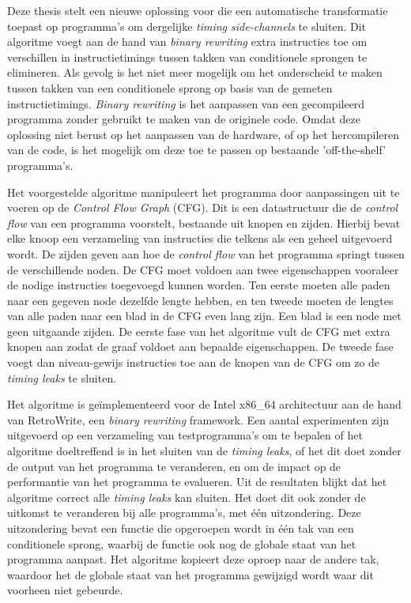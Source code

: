 \documentclass[master=cws,masteroption=ai, english]{kulemt}
\begin{document}
\begin{abstract*}
Deze thesis stelt een nieuwe oplossing voor die een automatische transformatie toepast op programma's om dergelijke \textit{timing side-channels} te sluiten. 
Dit algoritme voegt aan de hand van \textit{binary rewriting} extra instructies toe om verschillen in instructietimings tussen takken van conditionele sprongen te elimineren. 
Als gevolg is het niet meer mogelijk om het onderscheid te maken tussen takken van een conditionele sprong op basis van de gemeten instructietimings.
\textit{Binary rewriting} is het aanpassen van een gecompileerd programma zonder gebruikt te maken van de originele code. 
Omdat deze oplossing niet berust op het aanpassen van de hardware, of op het hercompileren van de code, is het mogelijk om deze toe te passen op bestaande 'off-the-shelf' programma's. 

Het voorgestelde algoritme manipuleert het programma door aanpassingen uit te voeren op de \textit{Control Flow Graph} (CFG). 
Dit is een datastructuur die de \textit{control flow} van een programma voorstelt, bestaande uit knopen en zijden. Hierbij bevat elke knoop een verzameling van instructies die telkens 
als een geheel uitgevoerd wordt. De zijden geven aan hoe de \textit{control flow} van het programma springt tussen de verschillende noden. 
De CFG moet voldoen aan twee eigenschappen vooraleer de nodige instructies toegevoegd kunnen worden. 
Ten eerste moeten alle paden naar een gegeven node dezelfde lengte hebben, en ten tweede 
moeten de lengtes van alle paden naar een blad in de CFG even lang zijn. Een blad is een node met geen uitgaande zijden. 
De eerste fase van het algoritme vult de CFG met extra knopen aan zodat de graaf voldoet aan bepaalde eigenschappen. 
De tweede fase voegt dan niveau-gewijs instructies toe aan de knopen van de CFG om zo de \textit{timing leaks} te sluiten. 

Het algoritme is ge\"implementeerd voor de Intel x86\_64 architectuur aan de hand van RetroWrite, een \textit{binary rewriting} framework. 
Een aantal experimenten zijn uitgevoerd op een verzameling van testprogramma's om te bepalen of het algoritme doeltreffend is in het sluiten van de \textit{timing leaks}, of het dit doet 
zonder de output van het programma te veranderen, en om de impact op de performantie van het programma te evalueren. 
Uit de resultaten blijkt dat het algoritme correct alle \textit{timing leaks} kan sluiten. Het doet dit ook zonder de uitkomst te veranderen bij alle programma's, met \'e\'en uitzondering. 
Deze uitzondering bevat een functie die opgeroepen wordt in \'e\'en tak van een conditionele sprong, waarbij de functie ook nog de globale staat van het programma aanpast. Het algoritme kopieert deze oproep naar de andere tak, waardoor
het de globale staat van het programma gewijzigd wordt waar dit voorheen niet gebeurde. 


\end{abstract*}
\end{document}
